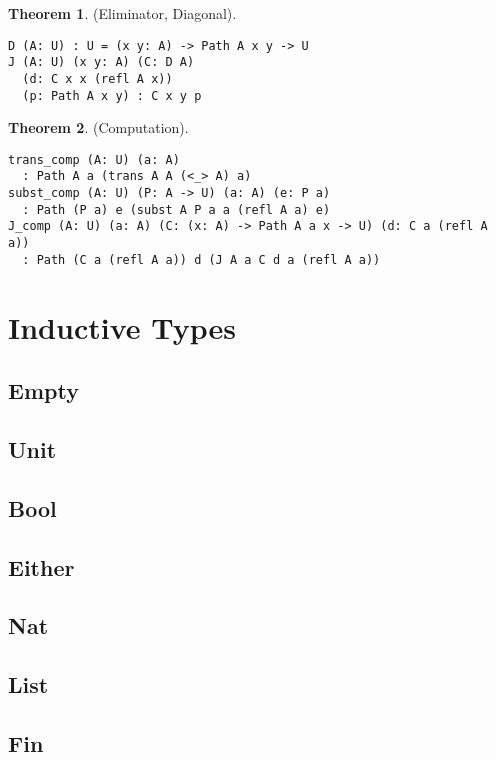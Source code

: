 \documentclass{article}
\theoremstyle{definition}
\newtheorem{theorem}{Theorem}
\begin{document}
\begin{theorem} (Eliminator, Diagonal).
\begin{lstlisting}
D (A: U) : U = (x y: A) -> Path A x y -> U
J (A: U) (x y: A) (C: D A)
  (d: C x x (refl A x))
  (p: Path A x y) : C x y p
\end{lstlisting}
\end{theorem}

\begin{theorem} (Computation).
\begin{lstlisting}
trans_comp (A: U) (a: A)
  : Path A a (trans A A (<_> A) a)
subst_comp (A: U) (P: A -> U) (a: A) (e: P a)
  : Path (P a) e (subst A P a a (refl A a) e)
J_comp (A: U) (a: A) (C: (x: A) -> Path A a x -> U) (d: C a (refl A a))
  : Path (C a (refl A a)) d (J A a C d a (refl A a))
\end{lstlisting}
\end{theorem}

\section{Inductive Types}

\subsection{Empty}

\subsection{Unit}

\subsection{Bool}

\subsection{Either}

\subsection{Nat}

\subsection{List}

\subsection{Fin}
\end{document}
